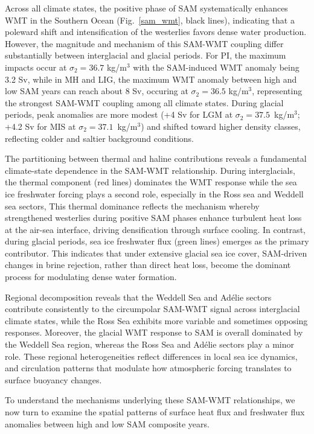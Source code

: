 \documentclass[pdflatex,sn-nature]{sn-jnl}
\begin{document}
Across all climate states, the positive phase of SAM systematically enhances WMT in the Southern Ocean (Fig.~\ref{sam_wmt}, black lines), indicating that a poleward shift and intensification of the westerlies favors dense water production. However, the magnitude and mechanism of this SAM-WMT coupling differ substantially between interglacial and glacial periods. For PI, the maximum impacts occur at $\sigma_2 = 36.7$ kg/m$^3$ with the SAM-induced WMT anomaly being 3.2 Sv,  while in MH and LIG, the maximum WMT anomaly between high and low SAM years can reach about 8 Sv, occuring at $\sigma_2 = 36.5$ kg/m$^3$, representing the strongest SAM-WMT coupling among all climate states. During glacial periods, peak anomalies are more modest (+4 Sv for LGM at $\sigma_2 = 37.5$~kg/m$^3$; +4.2 Sv for MIS at $\sigma_2 = 37.1$~kg/m$^3$) and shifted  toward higher density classes, reflecting colder and saltier background conditions.

The partitioning between thermal and haline contributions reveals a fundamental  climate-state dependence in the SAM-WMT relationship. During interglacials, the thermal component (red lines) dominates the WMT response while the sea ice freshwater forcing plays a second role, especially in the Ross sea and Weddell sea sectors,  This thermal dominance reflects the mechanism whereby strengthened westerlies during positive SAM phases enhance turbulent heat loss at the air-sea interface, driving densification through surface cooling. In contrast, during glacial periods, sea ice freshwater flux (green lines) emerges as the primary contributor. This indicates that under extensive glacial sea ice cover, SAM-driven changes in brine rejection, rather than direct heat loss, become the dominant process for modulating dense water formation.

Regional decomposition reveals that the Weddell Sea and Ad\'elie sectors contribute consistently to the circumpolar SAM-WMT signal across interglacial climate states, while the Ross Sea exhibits more variable and sometimes opposing responses. Moreover, the glacial WMT response to SAM is overall dominated by the Weddell Sea region, whereas the Ross Sea and Ad\'elie sectors play a minor role. These regional  heterogeneities reflect differences in local sea ice dynamics, and circulation patterns that modulate how atmospheric forcing translates to surface
  buoyancy changes.


To understand the mechanisms underlying these SAM-WMT relationships, we now turn to examine the spatial patterns of surface heat flux and freshwater flux anomalies between high and low SAM composite years.
\end{document}
